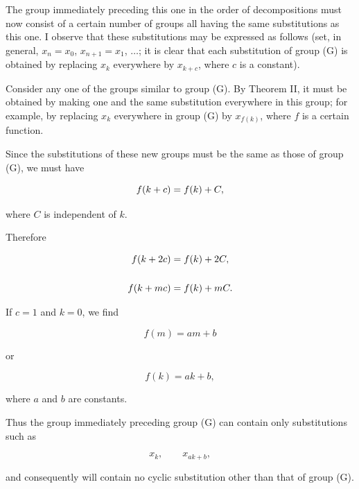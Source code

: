 
The group immediately preceding this one in the order of decompositions must
now consist of a certain number of groups all having the same substitutions as
this one. I observe that these substitutions may be expressed as follows (set,
in general, $x_{n}=x_{0}$, $x_{n+1}=x_{1}$, $\ldots$; it is clear that each
substitution of group (G) is obtained by replacing $x_{k}$ everywhere by
$x_{k+c}$, where $c$ is a constant).

Consider any one of the groups similar to group (G). By Theorem II, it must be
obtained by making one and the same substitution everywhere in this group; for
example, by replacing $x_{k}$ everywhere in group (G) by $x_{f(k)}$, where $f$
is a certain function.

Since the substitutions of these new groups must be the same as those of group
(G), we must have

\[
\GalControlReading{f(k+c)=f(k)+C}{W09-CD003},
\]

where $C$ is independent of $k$.

Therefore

\[
\begin{aligned}
f(k+2c)&=f(k)+2C,\\
&\hspace{2em}\dotfill\\
f(k+mc)&=f(k)+mC.
\end{aligned}
\]

If $c=1$ and $k=0$, we find

\[
f(m)=am+b
\]

or

\[
f(k)=ak+b,
\]

where $a$ and $b$ are constants.

Thus the group immediately preceding group (G) can contain only substitutions
such as

\[
x_{k},\qquad x_{ak+b},
\]

and consequently will contain no cyclic substitution other than that of group
(G).


